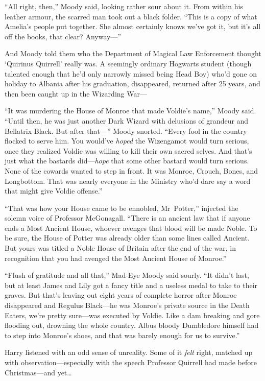 “All right, then,” Moody said, looking rather sour about it. From within his leather armour, the scarred man took out a black folder. “This is a copy of what Amelia’s people put together. She almost certainly knows we’ve got it, but it’s all off the books, that clear? Anyway—”

And Moody told them who the Department of Magical Law Enforcement thought ‘Quirinus Quirrell’ really was. A seemingly ordinary Hogwarts student (though talented enough that he’d only narrowly missed being Head Boy) who’d gone on holiday to Albania after his graduation, disappeared, returned after 25 years, and then been caught up in the Wizarding War—

“It was murdering the House of Monroe that made Voldie’s name,” Moody said. “Until then, he was just another Dark Wizard with delusions of grandeur and Bellatrix Black. But after that—” Moody snorted. “Every fool in the country flocked to serve him. You would’ve \emph{hoped} the Wizengamot would turn serious, once they realized Voldie was willing to kill their own sacred selves. And that’s just what the bastards did—\emph{hope} that some other bastard would turn serious. None of the cowards wanted to step in front. It was Monroe, Crouch, Bones, and Longbottom. That was nearly everyone in the Ministry who’d dare say a word that might give Voldie offense.”

“That was how your House came to be ennobled, Mr~Potter,” injected the solemn voice of Professor McGonagall. “There is an ancient law that if anyone ends a Most Ancient House, whoever avenges that blood will be made Noble. To be sure, the House of Potter was already older than some lines called Ancient. But yours was titled a Noble House of Britain after the end of the war, in recognition that you had avenged the Most Ancient House of Monroe.”

“Flush of gratitude and all that,” Mad-Eye Moody said sourly. “It didn’t last, but at least James and Lily got a fancy title and a useless medal to take to their graves. But that’s leaving out eight years of complete horror after Monroe disappeared and Regulus Black—he was Monroe’s private source in the Death Eaters, we’re pretty sure—was executed by Voldie. Like a dam breaking and gore flooding out, drowning the whole country. Albus bloody Dumbledore himself had to step into Monroe’s shoes, and that was barely enough for us to survive.”

Harry listened with an odd sense of unreality. Some of it \emph{felt} right, matched up with observation—especially with the speech Professor Quirrell had made before Christmas—and yet…

